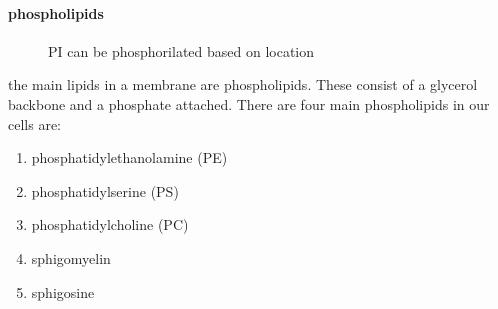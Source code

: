 \documentclass[../main.tex]{subfiles}
\begin{document}
        \paragraph{phospholipids}

            \begin{figure}[H]
                \centering
                \hspace{0.05\textwidth} %
                \caption{PI can be phosphorilated based on location}
                \label{fig:ITC_all}
            \end{figure}
         
            the main lipids in a membrane are phospholipids. These consist of a glycerol backbone and a phosphate attached.
            There are four main phospholipids in our cells are:
            \begin{enumerate}
                \item phosphatidylethanolamine (PE)
                \item phosphatidylserine (PS)
                \item phosphatidylcholine (PC)
                \item sphigomyelin
                \item sphigosine
            \end{enumerate}
\end{document}
